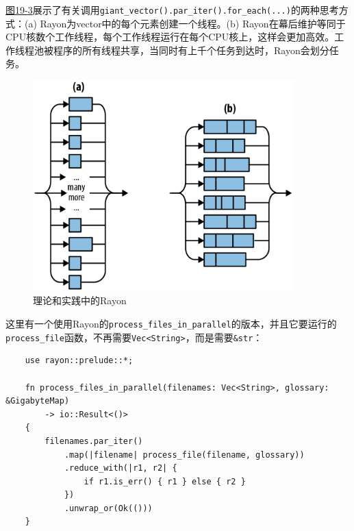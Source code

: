 \hyperref[f19-3]{图19-3}展示了有关调用\texttt{giant\_vector().par\_iter().for\_each(...)}的两种思考方式：(a) Rayon为vector中的每个元素创建一个线程。(b) Rayon在幕后维护等同于CPU核数个工作线程，每个工作线程运行在每个CPU核上，这样会更加高效。工作线程池被程序的所有线程共享，当同时有上千个任务到达时，Rayon会划分任务。

\begin{figure}[htbp]
    \centering
    \includegraphics[width=0.9\textwidth]{../img/f19-3.png}
    \caption{理论和实践中的Rayon}
    \label{f19-3}
\end{figure}

这里有一个使用Rayon的\texttt{process\_files\_in\_parallel}的版本，并且它要运行的\\
\texttt{process\_file}函数，不再需要\texttt{Vec<String>}，而是需要\texttt{\&str}：
\begin{verbatim}
    use rayon::prelude::*;

    fn process_files_in_parallel(filenames: Vec<String>, glossary: &GigabyteMap)
        -> io::Result<()>
    {
        filenames.par_iter()
            .map(|filename| process_file(filename, glossary))
            .reduce_with(|r1, r2| {
                if r1.is_err() { r1 } else { r2 }
            })
            .unwrap_or(Ok(()))
    }
\end{verbatim}

